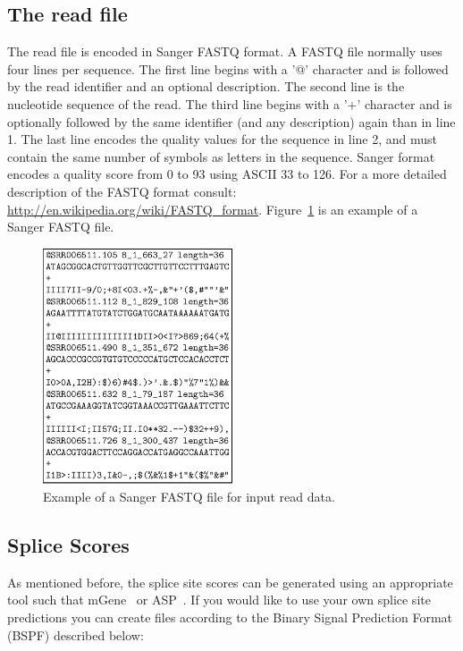 \documentclass{article}
\begin{document}
\subsection{The read file}
\label{sec:readfile}

The read file is encoded in Sanger FASTQ format. A FASTQ file normally
uses four lines per sequence. The first line begins with a '@'
character and is followed by the read identifier and an optional
description. The second line is the nucleotide sequence of the
read. The third line begins with a '+' character and is optionally
followed by the same identifier (and any description) again than in
line 1. The last line encodes the quality values for the sequence in
line 2, and must contain the same number of symbols as letters in the
sequence. Sanger format encodes a quality score from 0 to 93 using ASCII
33 to 126. For a more detailed description of the FASTQ format consult:
\url{http://en.wikipedia.org/wiki/FASTQ_format}. Figure~\ref{fig:fastq}
is an example of a Sanger FASTQ file.

\begin{figure}[h!]
\begin{center}
\includegraphics[width=0.5\textwidth]{ReadFile.jpg}
\end{center}
\caption{Example of a Sanger FASTQ file for input read data.}
\label{fig:fastq}
\end{figure}

\subsection{Splice Scores}
\label{sec:splicescoresfile}

As mentioned before, the splice site scores can be generated using an
appropriate tool such that
mGene~\cite{Schweikertetal09,Schweikertetal09b} or
ASP~\cite{Sonnenburgetal07}. If you would like to use your own splice
site 
predictions you can create files according to the Binary Signal
Prediction Format (BSPF) described below: 
\end{document}
